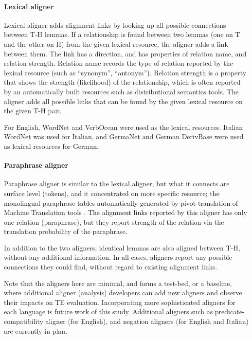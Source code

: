 \documentclass[11pt,letterpaper]{article}
\begin{document}
\paragraph{Lexical aligner} Lexical aligner adds alignment links by
looking up all possible connections between T-H lemmas. If a
relationship is found between two lemmas (one on T and the other on H)
from the given lexical resource, the aligner adds a link between
them. The link has a direction, and has properties of relation name,
and relation strength. Relation name records the type of relation
reported by the lexical resource (such as ``synonym'',
``antonym''). Relation strength is a property that shows the strength
(likelihood) of the relationship, which is often reported by an
automatically built resources such as distributional semantics
tools. The aligner adds all possible links that can be found by the
given lexical resource on the given T-H pair.  

For English, WordNet and VerbOcean were used as the lexical
resources. Italian WordNet was used for Italian, and GermaNet and
German DerivBase \cite{} were used as lexical resources for German. 

\paragraph{Paraphrase aligner} Paraphrase aligner is similar to the
lexical aligner, but what it connects are surface level (tokens),
and it concentrated on more specific resource; the monolingual
paraphrase tables automatically generated by pivot-translation of
Machine Translation tools \cite{}. The alignment links reported by
this aligner has only one relation (paraphrase), but they report
strength of the relation via the translation probability of the
paraphrase. 

In addition to the two aligners, identical lemmas are also aligned
between T-H, without any additional information. In all cases,
aligners report any possible connections they could find, without
regard to existing alignment links.  

Note that the aligners here are minimal, and forms a test-bed, or a
baseline, where additional aligner (analysis) developers can add new
aligners and observe their impacts on TE evaluation. Incorporating
more sophisticated aligners for each language is future work of this
study. Additional aligners such as predicate-compatibility aligner
(for English), and negation aligners (for English and Italian) are
currently in plan.  
\end{document}
